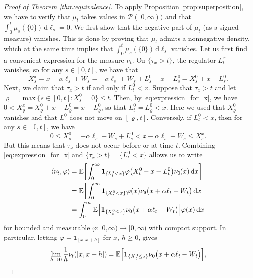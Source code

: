 \documentclass[11pt, a4paper]{article}
\theoremstyle{plain}
\theoremstyle{definition}
\theoremstyle{remark}
\numberwithin{equation}{section}
\newcommand{\ev}{\mathbb{E}}
\renewcommand{\P}{\mathcal{P}}
\renewcommand{\d}{\mathrm{d}}
\newcommand{\define}{\mathpunct{:}}
\renewcommand{\bf}[1]{\mathbf{#1}}
\begin{document}
\begin{proof}[Proof of Theorem \ref{thm:equivalence}]
To apply Proposition \ref{prop:superposition}, we have to verify that $\mu_t$ takes values in $\P([0, \infty))$ and that $\int_0^t \mu_s(\{0\}) \, \d \ell_s = 0$. We first show that the negative part of $\mu_t$ (as a signed measure) vanishes. This is done by proving that $\mu_t$ admits a nonnegative density, which at the same time implies that $\int_0^t \mu_s(\{0\}) \, \d \ell_s$ vanishes. Let us first find a convenient expression for the measure $\nu_t$. On $\{\tau_x > t\}$, the regulator $L^x_t$ vanishes, so for any $s \in [0, t]$, we have that
\begin{equation} \label{eq:expression_for_x}
    X^x_s = x - \alpha \ell_s + W_s = - \alpha \ell_s + W_s + L^0_s + x - L^0_s = X^0_s + x - L^0_s.
\end{equation}
Next, we claim that $\tau_x > t$ if and only if $L^0_t < x$. Suppose that $\tau_x > t$ and let $\varrho = \max\{s \in [0, t] \define X^0_s = 0\} \leq t$. Then, by \eqref{eq:expression_for_x}, we have $0 < X^x_{\varrho} = X^0_{\varrho} + x - L^0_{\varrho} = x - L^0_{\varrho}$, so that $L^0_t = L^0_{\varrho} < x$. Here we used that $X^0_{\varrho}$ vanishes and that $L^0$ does not move on $[\varrho, t]$. Conversely, if $L^0_t < x$, then for any $s \in [0, t]$, we have
\begin{equation*}
    0 \leq X^0_s = - \alpha \ell_s + W_s + L^0_s < x - \alpha \ell_s + W_s \leq X^x_s.
\end{equation*}
But this means that $\tau_x$ does not occur before or at time $t$. Combining \eqref{eq:expression_for_x} and $\{\tau_x > t\} = \{L^0_t < x\}$ allows us to write
\begin{align*}
    \langle \nu_t, \varphi\rangle &= \ev\biggl[\int_0^{\infty} \bf{1}_{\{L^0_t < x\}} \varphi\bigl(X^0_t + x - L^0_t\bigr) \nu_0(x) \, \d x\biggr] \\
    &= \ev\biggl[\int_0^{\infty} \bf{1}_{\{X^0_t < x\}} \varphi(x) \nu_0\bigl(x + \alpha \ell_t - W_t\bigr) \, \d x \biggr] \\
    &= \int_0^{\infty} \ev\Bigl[\bf{1}_{\{X^0_t \leq x\}}\nu_0\bigl(x + \alpha \ell_t - W_t\bigr) \Bigr] \varphi(x) \, \d x
\end{align*}
for bounded and measurable $\varphi \define [0, \infty) \to [0, \infty)$ with compact support. In particular, letting $\varphi = \bf{1}_{[x, x + h]}$ for $x$, $h \geq 0$, gives
\begin{equation*}
    \lim_{h \to 0} \frac{1}{h} \nu_t([x, x + h]) = \ev\Bigl[\bf{1}_{\{X^0_t \leq x\}}\nu_0\bigl(x + \alpha \ell_t - W_t\bigr) \Bigr],
\end{equation*}

\end{proof}
\end{document}

